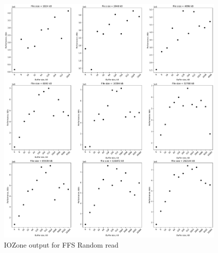 \begin{figure}[!htb]
	\label{fig:bench_ffs_rnd_read}
	\begin{center}
		\includegraphics[width=1.0\textwidth]{figures/benchmarking/ffs/Random read.pdf}
	\end{center}
	\caption{IOZone output for FFS Random read}
\end{figure}

